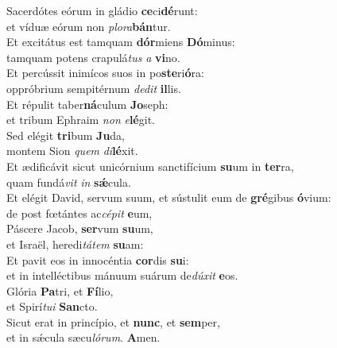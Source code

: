 \evenverse Sacerdótes eórum in gládio \textbf{ce}ci\textbf{dé}runt:~\*\\
\evenverse et víduæ eórum non \textit{plo}\textit{ra}\textbf{bán}tur.\\
\oddverse Et excitátus est tamquam \textbf{dór}miens \textbf{Dó}minus:~\*\\
\oddverse tamquam potens crapulá\textit{tus} \textit{a} \textbf{vi}no.\\
\evenverse Et percússit inimícos suos in po\textbf{ste}ri\textbf{ó}ra:~\*\\
\evenverse oppróbrium sempitérnum \textit{de}\textit{dit} \textbf{il}lis.\\
\oddverse Et répulit taber\textbf{ná}culum \textbf{Jo}seph:~\*\\
\oddverse et tribum Ephraim \textit{non} \textit{e}\textbf{lé}git.\\
\evenverse Sed elégit \textbf{tri}bum \textbf{Ju}da,~\*\\
\evenverse montem Sion \textit{quem} \textit{di}\textbf{lé}xit.\\
\oddverse Et ædificávit sicut unicórnium sanctifícium \textbf{su}um in \textbf{ter}ra,~\*\\
\oddverse quam fundá\textit{vit} \textit{in} \textbf{sǽ}cula.\\
\evenverse Et elégit David, servum suum, et sústulit eum de \textbf{gré}gibus \textbf{ó}vium:~\*\\
\evenverse de post fœtántes ac\textit{cé}\textit{pit} \textbf{e}um,\\
\oddverse Páscere Jacob, \textbf{ser}vum \textbf{su}um,~\*\\
\oddverse et Israël, heredi\textit{tá}\textit{tem} \textbf{su}am:\\
\evenverse Et pavit eos in innocéntia \textbf{cor}dis \textbf{su}i:~\*\\
\evenverse et in intelléctibus mánuum suárum de\textit{dú}\textit{xit} \textbf{e}os.\\
\oddverse Glória \textbf{Pa}tri, et \textbf{Fí}lio,~\*\\
\oddverse et Spirí\textit{tu}\textit{i} \textbf{San}cto.\\
\evenverse Sicut erat in princípio, et \textbf{nunc}, et \textbf{sem}per,~\*\\
\evenverse et in sǽcula sæcu\textit{ló}\textit{rum}. \textbf{A}men.\\
